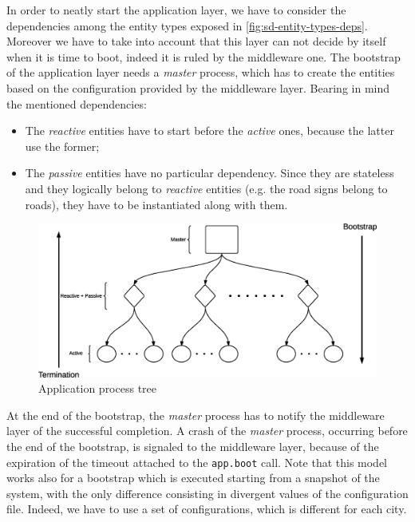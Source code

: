 In order to neatly start the application layer, we have to consider the 
dependencies among the entity types exposed in \ref{fig:sd-entity-types-deps}. 
Moreover we have to take into account that this layer can not decide by itself 
when it is time to boot, indeed it is ruled by the middleware one.
The bootstrap of the application layer needs a \textit{master} process, 
which has to create the entities based on the configuration provided by 
the middleware layer. 
Bearing in mind the mentioned dependencies:
\begin{itemize}
  \item The \textit{reactive} entities have to start before the \textit{active} 
ones, because the latter use the former; 
  \item The \textit{passive} entities have no particular dependency. Since 
they are stateless and they logically belong to \textit{reactive} entities 
(e.g. the road signs belong to roads), they have to be instantiated along with them.
\end{itemize}

\begin{figure}[H]
  \centering
  \includegraphics[width=\columnwidth]{sections/images/solution/app_proc_tree.eps}
  \caption{Application process tree}
  \label{fig:app-proc-tree}
\end{figure}

At the end of the bootstrap, the \textit{master} process has to notify the 
middleware layer of the successful completion. A crash of the
\textit{master} process, occurring before the end of the bootstrap, 
is signaled to the middleware layer, because of the expiration 
of the timeout attached to the \texttt{app.boot} call. 
Note that this model works also for a bootstrap which is executed starting 
from a snapshot of the system, with the only difference consisting in divergent
values of the configuration file. Indeed, we have to use a set of 
configurations, which is different for each city.